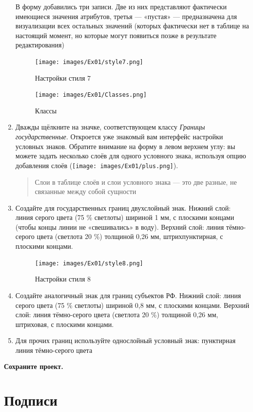 \documentclass[
  12pt,
]{book}
\begin{document}
\begin{enumerate}
  В форму добавились три записи. Две из них представляют фактически имеющиеся значения атрибутов, третья --- «пустая» --- предназначена для визуализации всех остальных значений (которых фактически нет в таблице на настоящий момент, но которые могут появиться позже в результате редактирования)

  \begin{figure}
  \centering
  \texttt{[image: images/Ex01/style7.png]}
  \caption{Настройки стиля 7}
  \end{figure}

  \begin{figure}
  \centering
  \texttt{[image: images/Ex01/Classes.png]}
  \caption{Классы}
  \end{figure}
\item
  Дважды щёлкните на значке, соответствующем классу \emph{Границы государственные}. Откроется уже знакомый вам интерфейс настройки условных знаков. Обратите внимание на форму в левом верхнем углу: вы можете задать несколько слоёв для одного условного знака, используя опцию добавления слоёв (\texttt{[image: images/Ex01/plus.png]}).

  \begin{quote}
  Слои в таблице слоёв и слои условного знака --- это две разные, не связанные между собой сущности
  \end{quote}
\item
  Создайте для государственных границ двухслойный знак. Нижний слой: линия серого цвета (75 \% светлоты) шириной 1 мм, с плоскими концами (чтобы концы линии не «свешивались» в воду). Верхний слой: линия тёмно-серого цвета (светлота 20 \%) толщиной 0,26 мм, штрихпунктирная, с плоскими концами.

  \begin{figure}
  \centering
  \texttt{[image: images/Ex01/style8.png]}
  \caption{Настройки стиля 8}
  \end{figure}
\item
  Создайте аналогичный знак для границ субъектов РФ. Нижний слой: линия серого цвета (75 \% светлоты) шириной 0,8 мм, с плоскими концами. Верхний слой: линия тёмно-серого цвета (светлота 20 \%) толщиной 0,26 мм, штриховая, с плоскими концами.
\item
  Для прочих границ используйте однослойный условный знак: пунктирная линия тёмно-серого цвета
\end{enumerate}

\textbf{Сохраните проект.}

\hypertarget{map-design-general-labels}{%
\section{Подписи}\label{map-design-general-labels}}
\end{document}
